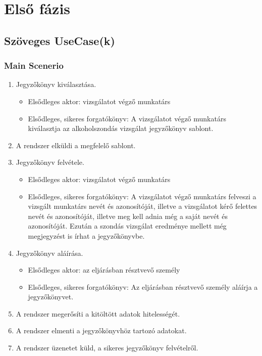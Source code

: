 \chapter{Első fázis}\label{sect:FirstPhase}
\section{Szöveges UseCase(k)}
\subsection{Main Scenerio}
\begin{enumerate}
	\item Jegyzőkönyv kiválasztása.
		\begin{itemize}
			\item Elsődleges aktor: vizsgálatot végző munkatárs
			\item Elsődleges, sikeres forgatókönyv: A vizsgálatot végző munkatárs kiválasztja az alkoholszondás vizsgálat jegyzőkönyv sablont.
		\end{itemize}
	\item A rendszer elküldi a megfelelő sablont.	
	\item Jegyzőkönyv felvétele.
		\begin{itemize}
			\item Elsődleges aktor: vizsgálatot végző munkatárs
			\item Elsődleges, sikeres forgatókönyv: A vizsgálatot végző munkatárs felveszi a vizsgált munkatárs nevét és azonosítóját, illetve a vizsgálatot kérő felettes nevét és azonosítóját, illetve meg kell adnia még a saját nevét és azonosítóját. Ezután a szondás vizsgálat eredménye mellett még megjegyzést is írhat a jegyzőkönyvbe. 
		\end{itemize}
	\item Jegyzőkönyv aláírása.
	\begin{itemize}
		\item Elsődleges aktor: az eljárásban résztvevő személy 
		\item Elsődleges, sikeres forgatókönyv: Az eljárásban résztvevő személy aláírja a jegyzőkönyvet.
	\end{itemize}
	\item A rendszer megerősíti a kitöltött adatok hitelességét.
	\item A rendszer elmenti a jegyzőkönyvhöz tartozó adatokat.
	\item A rendszer üzenetet küld, a sikeres jegyzőkönyv felvételről.
\end{enumerate}

